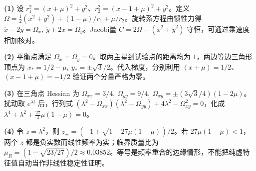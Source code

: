 \par\noindent\textbf{(1)} 设 \(r_1^2=(x+\mu)^2+y^2\)、\(r_2^2=(x-1+\mu)^2+y^2\)。定义 \(\Omega=\tfrac12(x^2+y^2)+(1-\mu)/r_1+\mu/r_2\)。旋转系方程由惯性力得 \(\ddot x-2\dot y=\Omega_x,\ \ddot y+2\dot x=\Omega_y\)。Jacobi量 \(C=2\Omega-(\dot x^2+\dot y^2)\) 守恒，可通过乘速度相加核对。
\par\noindent\textbf{(2)} 平衡点满足 \(\Omega_x=\Omega_y=0\)。取两主星到试验点的距离均为 \(1\)，两边等边三角形顶点为 \(x_*=1/2-\mu,\ y_*=\pm\sqrt3/2\)。代入梯度，分别利用 \((x+\mu)=1/2\)、\((x-1+\mu)=-1/2\) 验证两个分量严格为零。
\par\noindent\textbf{(3)} 在三角点 Hessian 为 \(\Omega_{xx}=3/4,\ \Omega_{yy}=9/4,\ \Omega_{xy}=\pm (3\sqrt3/4)(1-2\mu)\)。扰动取 \(e^{\lambda t}\) 后，行列式 \((\lambda^2-\Omega_{xx})(\lambda^2-\Omega_{yy})+4\lambda^2-\Omega_{xy}^2=0\)，化成 \(\lambda^4+\lambda^2+\tfrac{27}{4}\mu(1-\mu)=0\)。
\par\noindent\textbf{(4)} 令 \(z=\lambda^2\)，则 \(z_{\pm}=(-1\pm\sqrt{1-27\mu(1-\mu)})/2\)。若 \(27\mu(1-\mu)<1\)，两个 \(z\) 都是负实数而线性频率为实；临界质量比为 \(\mu_R=(1-\sqrt{23/27})/2\approx0.03852\)。等号是频率重合的边缘情形，不能把纯虚特征值自动当作非线性稳定性证明。
